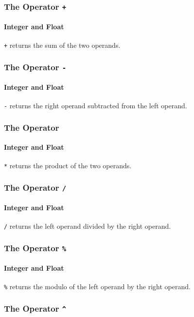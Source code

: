 \subsubsection{The Operator {\tt +}}
\paragraph{Integer and Float}
\verb!+! returns the sum of the two operands.

\subsubsection{The Operator {\tt -}}
\paragraph{Integer and Float}
\verb!-! returns the right operand subtracted from the left operand.

\subsubsection{The Operator {\tt *}}
\paragraph{Integer and Float}
\verb!*! returns the product of the two operands.

\subsubsection{The Operator {\tt /}}
\paragraph{Integer and Float}
\verb!/! returns the left operand divided by the right operand.

\subsubsection{The Operator {\tt \%}}
\paragraph{Integer and Float}
\verb!%! returns the modulo of the left operand by the right operand.

\subsubsection{The Operator {\tt \textasciicircum}}
